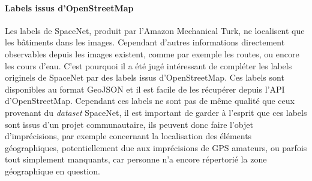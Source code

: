 \documentclass[a4paper, 11pt]{report}
\begin{document}
\paragraph{Labels issus d'OpenStreetMap}
Les labels de SpaceNet, produit par l'Amazon Mechanical Turk, ne localisent que les bâtiments dans les images. Cependant d'autres informations directement observables depuis les images existent, comme par exemple les routes, ou encore les cours d'eau.
C'est pourquoi il a été jugé intéressant de compléter les labels originels de SpaceNet par des labels issus d'OpenStreetMap.
Ces labels sont disponibles au format GeoJSON et il est facile de les récupérer depuis l'API d'OpenStreetMap.
Cependant ces labels ne sont pas de même qualité que ceux provenant du \emph{dataset} SpaceNet, il est important de garder à l'esprit que ces labels sont issus d'un projet communautaire, ils peuvent donc faire l'objet d'imprécisions, par exemple concernant la localisation des éléments géographiques, potentiellement due aux imprécisions de GPS amateurs, ou parfois tout simplement manquants, car personne n'a encore répertorié la zone géographique en question.
\end{document}
